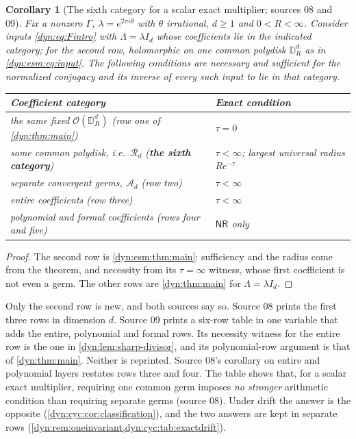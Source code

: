 \documentclass[11pt,letterpaper]{article}
\newtheorem{corollary}[corollary]{Corollary}
\theoremstyle{definition}
\theoremstyle{remark}
\newcommand{\OO}{\mathcal O}
\newcommand{\nres}{\mathsf{NR}}
\numberwithin{equation}{section}
\begin{document}
\begin{corollary}[The sixth category for a scalar exact multiplier; sources 08
and 09]\label{dyn:esm:cor:sixthrow}
Fix a nonzero $\Gamma$, $\lambda=e^{2\pi i\theta}$ with $\theta$ irrational,
$d\ge1$ and $0<R<\infty$. Consider inputs \eqref{dyn:eq:Fintro} with
$\Lambda=\lambda I_d$ whose coefficients lie in the indicated category; for
the second row, holomorphic on one common polydisk $\mathbb D_R^{d}$ as in
\eqref{dyn:esm:eq:input}. The following conditions are necessary and
sufficient for the normalized conjugacy and its inverse of \emph{every} such
input to lie in that category.
{\normalfont
\begin{center}
\begin{tabular}{@{}P{0.60\textwidth}P{0.28\textwidth}@{}}
\toprule
Coefficient category & Exact condition\\
\midrule
the same fixed $\OO(\mathbb D_R^{d})$ (row one of \cref{dyn:thm:main}) & $\tau=0$\\
some common polydisk, i.e.\ $\mathcal R_d$ (\textbf{the sixth category}) &
 $\tau<\infty$; largest universal radius $Re^{-\tau}$\\
separate convergent germs, $\mathcal A_d$ (row two) & $\tau<\infty$\\
entire coefficients (row three) & $\tau<\infty$\\
polynomial and formal coefficients (rows four and five) & $\nres$ only\\
\bottomrule
\end{tabular}
\end{center}}
\end{corollary}
\begin{proof}
The second row is \cref{dyn:esm:thm:main}: sufficiency and the radius come
from the theorem, and necessity from its $\tau=\infty$ witness, whose first
coefficient is not even a germ. The other rows are \cref{dyn:thm:main} for
$\Lambda=\lambda I_d$.
\end{proof}

Only the second row is new, and both sources say so. Source 08 prints the
first three rows in dimension $d$. Source 09 prints a six-row table in one
variable that adds the entire, polynomial and formal rows. Its necessity
witness for the entire row is the one in \cref{dyn:lem:sharp-divisor}, and its
polynomial-row argument is that of \cref{dyn:thm:main}. Neither is reprinted.
Source 08's corollary on entire and polynomial layers restates rows three
and four. The table shows that, for a scalar exact multiplier, requiring one
common germ imposes \emph{no stronger} arithmetic condition than requiring
separate germs (source 08). Under drift the answer is the opposite
(\cref{dyn:cyc:cor:classification}), and the two answers are kept in
separate rows (\cref{dyn:rem:oneinvariant,dyn:cyc:tab:exactdrift}).
\end{document}
